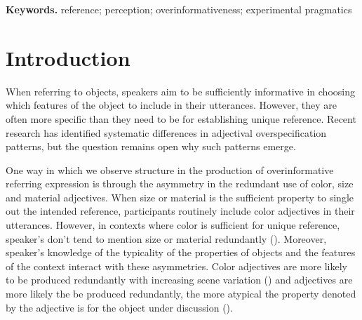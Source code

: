 \documentclass[12pt,letterpaper]{article}
\newenvironment{keywords}{%
\vspace{.5em}
\noindent\begin{minipage}{1\textwidth}
\setlength{\leftskip}{0.4in}
\setlength{\rightskip}{0.4in}
\textbf{Keywords.}}
{\end{minipage}}
\begin{document}
\begin{keywords} %
reference; perception; overinformativeness; experimental pragmatics
\end{keywords}

\section{Introduction} 

When referring to objects, speakers aim to be sufficiently informative in choosing which features of the object to include in their utterances. However, they are often more specific than they need to be for establishing unique reference. Recent research has identified systematic differences in adjectival overspecification patterns, but the question remains open why such patterns emerge.

One way in which we observe structure in the production of overinformative referring expression is through the asymmetry in the redundant use of color, size and material adjectives. When size or material is the sufficient property to single out the intended reference, participants routinely include color adjectives in their utterances. However, in contexts where color is sufficient for unique reference, speaker's don't tend to mention size or material redundantly (\citealt{Pechmann1989, Sedivy2003, GattEtAl2011, RubioFernandez2016, DegenEtAl2020}). Moreover, speaker's knowledge of the typicality of the properties of objects and the features of the context interact with these asymmetries. Color adjectives are more likely to be produced redundantly with increasing scene variation (\citealt{DegenEtAl2020, DaviesKatsos2013, KoolenEtAl2013}) and adjectives are more likely the be produced redundantly, the more atypical the property denoted by the adjective is for the object under discussion (\citealt{DegenEtAl2020, WesterbeekEtAl2015, Mitchell2013}).
\end{document}
